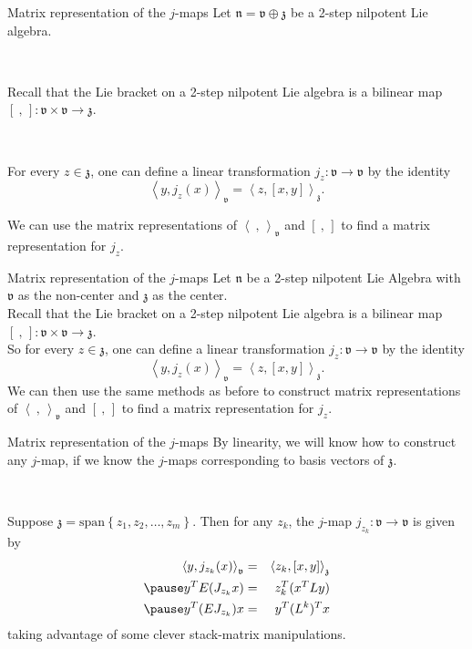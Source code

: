 \documentclass[11]{beamer}
\newcommand{\br}[2]{\left[#1,#2\right]}
\newcommand{\bre}{\br{\ }{\,}}
\newcommand{\ds}{\oplus}
\newcommand{\inp}[2]{\left\langle #1,#2\right\rangle}
\newcommand{\inpe}{\inp{\ }{\,}}
\newcommand{\lal}[1]{\mathfrak{#1}}
\newcommand{\lan}{\lal{n}}
\newcommand{\lav}{\lal{v}}
\newcommand{\laz}{\lal{z}}
\renewcommand{\span}[1]{\text{span}\left\{#1\right\}}
\begin{document}
\begin{frame}{Matrix representation of the $j$-maps}
Let $\lan = \lav \ds \laz$ be a 2-step nilpotent Lie algebra.
\pause

\

Recall that the Lie bracket on a 2-step nilpotent Lie algebra is a bilinear
map $\bre :\lav \times \lav \to \laz$.
\pause

\


For every $z \in \laz$, one can define a linear transformation 
$j_z :\lav \to \lav$ by the identity
$$
\inp{y}{j_z(x)}_\lav = \inp{z}{\br{x}{y}}_\laz.
$$
\pause

We can use the matrix representations of $\inpe_\lav$ and $\bre$ to find a
matrix representation for $j_z$.
\end{frame}

\begin{frame}{Matrix representation of the $j$-maps}
Let $\lan$ be a 2-step nilpotent Lie Algebra with $\lav$ as the non-center and $\laz$ as the center.\\
Recall that the Lie bracket on a 2-step nilpotent Lie algebra is a bilinear
map $\bre :\lav \times \lav \to \laz$.\\
So for every $z \in \laz$, one can define a linear transformation 
$j_z :\lav \to \lav$ by the identity
$$
\inp{y}{j_z(x)}_\lav = \inp{z}{\br{x}{y}}_\laz.
$$
We can then use the same methods as before to construct matrix representations of $\inpe_\lav$ and $\bre$ to find a
matrix representation for $j_z$.
\end{frame}

\begin{frame}{Matrix representation of the $j$-maps}
By linearity, we will know how to construct any $j$-map, if we know the
$j$-maps corresponding to basis vectors of $\laz$. 
\pause

\

Suppose $\laz = \span{z_1,z_2,\hdots,z_m}$.
\pause
Then for any $z_k$, the $j$-map $j_{z_k} :\lav \to \lav$ is given by
\begin{eqnarray*}
\inp{y}{j_{z_k}(x)}_\lav	& = & \inp{z_k}{\br{x}{y}}_\laz \\ \pause
y^T E (J_{z_k}x)		& = & z_k^T (x^TLy) \\ \pause
y^T (E J_{z_k}) x		& = & y^T(L^k)^T x
\end{eqnarray*}
taking advantage of some clever stack-matrix manipulations.
\end{frame}
\end{document}
